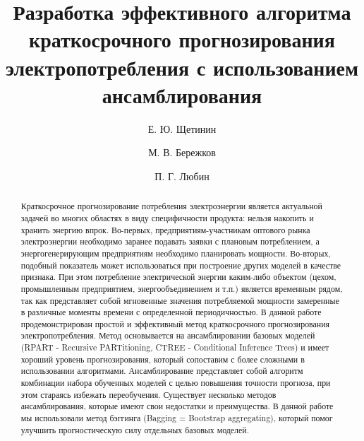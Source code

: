 \documentclass[60x84/16,8pt]{ittmm}
\begin{document}

\title{Разработка эффективного алгоритма краткосрочного прогнозирования электропотребления с использованием ансамблирования}

\author[1]{Е. Ю. Щетинин}
\author[2]{М. В. Бережков}
\author[2]{П. Г. Любин}

\address[1]{Всероссийский научно-исследовательский институт\\
  по проблемам гражданской обороны  и чрезвычайных ситуаций\\
  МЧС России (федеральный центр науки и высоких технологий)\\
  ул. Давыдковская, д.7, Москва, Россия, 121352}
\address[2]{Федеральное государственное бюджетное образовательное учреждение\\
  Высшего образования\\
  Московский государственный технологический университет ``СТАНКИН''\\
  пер. Вадковский, д.3а, Москва, Россия, 127055}


\begin{abstract}
Краткосрочное прогнозирование потребления электроэнергии является актуальной
задачей во многих областях в виду специфичности продукта: нельзя накопить и
хранить энергию впрок. Во-первых, предприятиям-участникам оптового рынка
электроэнергии необходимо заранее подавать заявки с плановым потреблением, а
энергогенерирующим предприятиям необходимо планировать мощности. Во-вторых,
подобный показатель может использоваться при построение других моделей в
качестве признака. При этом потребление электрической энергии каким-либо
объектом (цехом, промышленным предприятием, энергообъединением и т.п.) является
временным рядом, так как представляет собой мгновенные значения потребляемой
мощности замеренные в различные моменты времени с определенной периодичностью. В
данной работе продемонстрирован простой и эффективный метод краткосрочного
прогнозирования электропотребления. Метод основывается на ансамблировании
базовых моделей (RPART - Recursive PARTitioning, CTREE - Conditional Inference
Trees) и имеет хороший уровень прогнозирования, который сопоставим с более
сложными в использовании алгоритмами. Ансамблирование представляет собой
алгоритм комбинации набора обученных моделей с целью повышения точности
прогноза, при этом стараясь избежать переобучения. Существует несколько методов
ансамблирования, которые имеют свои недостатки и преимущества. В данной работе
мы использовали метод бэггинга (Bagging = Bootstrap aggregating), который помог
улучшить прогностическую силу отдельных базовых моделей.
\end{abstract}
\end{document}
